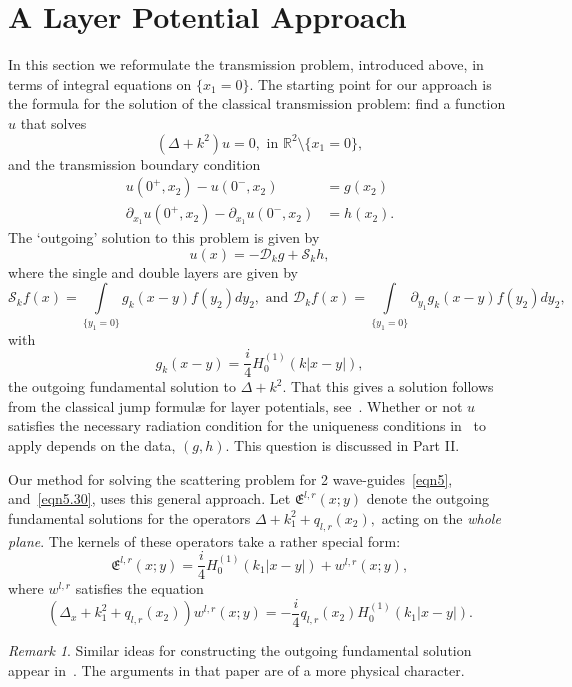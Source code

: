 \documentclass[11pt]{article}
\newcommand\fE{\mathfrak E}
\newcommand\cS{\mathcal{S}}
\newcommand\cD{\mathcal{D}}
\newcommand\bbR{\mathbb R}
\newcommand\pa{\partial}
\theoremstyle{definition}
\theoremstyle{remark}
\newtheorem{remark}{Remark}
\begin{document}
\section{A Layer Potential Approach}\label{sec4}
In this section we reformulate the transmission problem, introduced above, in
terms of integral equations on $\{x_1=0\}.$ The starting point for our approach
is the formula for the solution of the classical transmission problem: find a
function $u$ that solves
$$(\Delta+k^2)u=0,\text{ in }\bbR^2\setminus \{x_1=0\},$$
and the transmission boundary condition
\begin{equation}
  \begin{split}
    u(0^+,x_2)-u(0^-,x_2)&=g(x_2)\\
     \pa_{x_1}u(0^+,x_2)-\pa_{x_1}u(0^-,x_2)&=h(x_2).
  \end{split}
\end{equation}
The `outgoing' solution to this problem is given by
\begin{equation}\label{eqn28.35}
  u(x)=-\cD_k g+\cS_k h,
\end{equation}
where the single and double layers are given by
\begin{equation}
  \cS_kf(x)=\int\limits_{\{y_1=0\}}g_k(x-y)f(y_2)dy_2,\text{ and }
  \cD_kf(x)=\int\limits_{\{y_1=0\}}\pa_{y_1}g_k(x-y)f(y_2)dy_2,
\end{equation}
with
$$g_k(x-y)=\frac{i}{4}H^{(1)}_0(k|x-y|),$$
the outgoing fundamental solution to $\Delta+k^2.$
That this gives a solution follows from the classical jump formul{\ae}
for layer potentials, see~\cite{ColtonKress}.  Whether or not $u$ satisfies the
necessary radiation condition for the uniqueness conditions in~\cite{Odeh1963} to
apply depends on the data, $(g,h).$ This question is discussed in Part II.

Our method for solving the scattering problem for 2 wave-guides~\eqref{eqn5},
and~\eqref{eqn5.30}, uses this general approach.  Let $\fE^{l,r}(x;y)$ denote
the outgoing fundamental solutions for the operators
$\Delta+k_1^2+q_{l,r}(x_2),$ acting on the \emph{whole plane}. The kernels of
these operators take a rather special form:
\begin{equation}
  \fE^{l,r}(x;y)=\frac{i}{4}H^{(1)}_0(k_1|x-y|)+w^{l,r}(x;y),
\end{equation}
where $w^{l,r}$ satisfies the equation
\begin{equation}\label{eqn32.10}
  (\Delta_x+k_1^2+q_{l,r}(x_2))w^{l,r}(x;y)=-\frac{i}{4}q_{l,r}(x_2)H^{(1)}_0(k_1|x-y|).
\end{equation}
\begin{remark}
  Similar ideas for constructing the outgoing fundamental solution appear
  in~\cite{Nosich1994}. The arguments in that paper are of a more physical
  character.
\end{remark}
\end{document}
